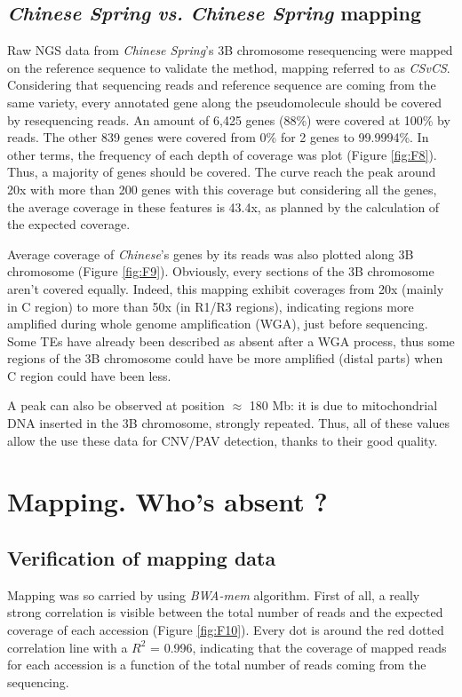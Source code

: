 \documentclass[a4paper, 12pt]{article}
\begin{document}
\begin{onehalfspace}
        \subsection{\textit{Chinese Spring} \textit{vs.} \textit{Chinese Spring} mapping}
        
Raw NGS data from \textit{Chinese Spring}'s 3B chromosome resequencing were mapped on the reference sequence to validate the method, mapping referred to as \textit{CSvCS}. Considering that sequencing reads and reference sequence are coming from the same variety, every annotated gene along the pseudomolecule should be covered by resequencing reads. An amount of 6,425 genes (88\%) were covered at 100\% by reads. The other 839 genes were covered from 0\% for 2 genes to 99.9994\%. In other terms, the frequency of each depth of coverage was plot (Figure \ref{fig:F8}). Thus, a majority of genes should be covered. The curve reach the peak around 20x with more than 200 genes with this coverage but considering all the genes, the average coverage in these features is 43.4x, as planned by the calculation of the expected coverage.

Average coverage of \textit{Chinese}'s genes by its reads was also plotted along 3B chromosome (Figure \ref{fig:F9}). Obviously, every sections of the 3B chromosome aren't covered equally. Indeed, this mapping exhibit coverages from 20x (mainly in C region) to more than 50x (in R1/R3 regions), indicating regions more amplified during whole genome amplification (WGA), just before sequencing. Some TEs have already been described as absent after a WGA process, thus some regions of the 3B chromosome could have be more amplified (distal parts) when C region could have been less.

A peak can also be observed at position $\approx$ 180 Mb: it is due to mitochondrial DNA inserted in the 3B chromosome, strongly repeated. Thus, all of these values allow the use these data for CNV/PAV detection, thanks to their good quality.

    \section{Mapping. Who's absent ?}
    
        \subsection{Verification of mapping data}

Mapping was so carried by using \textit{BWA-mem} algorithm. First of all, a really strong correlation is visible between the total number of reads and the expected coverage of each accession (Figure \ref{fig:F10}). Every dot is around the red dotted correlation line with a $R^{2}$ = 0.996, indicating that the coverage of mapped reads for each accession is a function of the total number of reads coming from the sequencing.


\end{onehalfspace}
\end{document}
